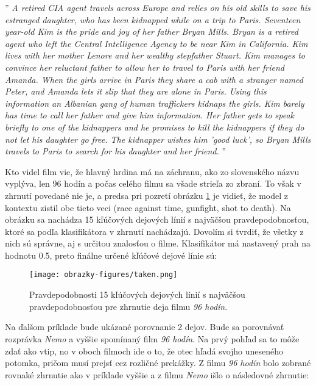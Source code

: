 \noindent''\textit{
A retired CIA agent travels across Europe and relies on his old skills to save his estranged daughter, who has been kidnapped while on a trip to Paris. Seventeen year-old Kim is the pride and joy of her father Bryan Mills. Bryan is a retired agent who left the Central Intelligence Agency to be near Kim in California. Kim lives with her mother Lenore and her wealthy stepfather Stuart. Kim manages to convince her reluctant father to allow her to travel to Paris with her friend Amanda. When the girls arrive in Paris they share a cab with a stranger named Peter, and Amanda lets it slip that they are alone in Paris. Using this information an Albanian gang of human traffickers kidnaps the girls. Kim barely has time to call her father and give him information. Her father gets to speak briefly to one of the kidnappers and he promises to kill the kidnappers if they do not let his daughter go free. The kidnapper wishes him 'good luck', so Bryan Mills travels to Paris to search for his daughter and her friend.
}''

Kto videl film vie, že hlavný hrdina má na záchranu, ako zo slovenského názvu vyplýva, len 96 hodín a počas celého filmu sa všade strieľa zo zbraní. To však v zhrnutí povedané nie je, a predsa pri pozretí obrázku \ref{taken} je vidieť, že model z kontextu zistil obe tieto veci (race against time, gunfight, shot to death). Na obrázku sa nachádza 15 kľúčových dejových línií s najväčšou pravdepodobnosťou, ktoré sa podľa klasifikátora v zhrnutí nachádzajú. Dovolím si tvrdiť, že všetky z nich sú správne, aj s určitou znalosťou o filme. Klasifikátor má nastavený prah na hodnotu 0.5, preto finálne určené kľúčové dejové línie sú:


\begin{figure}[ht!]
	\centering
	\texttt{[image: obrazky-figures/taken.png]}
	\caption{Pravdepodobnosti 15 kľúčových dejových línií s najväčšou pravdepodobnosťou pre zhrnutie deja filmu \textit{96 hodín}.}
	\label{taken}
\end{figure}

Na ďalšom príklade bude ukázané porovnanie 2 dejov. Bude sa porovnávať rozprávka \textit{Nemo} a vyššie spomínaný film \textit{96 hodín}. Na prvý pohľad sa to môže zdať ako vtip, no v oboch filmoch ide o to, že otec hľadá svojho uneseného potomka, pričom musí prejsť cez rozličné prekážky. Z filmu \textit{96 hodín} bolo zobrané rovnaké zhrnutie ako v príklade vyššie a z filmu \textit{Nemo} išlo o následovné zhrnutie:

